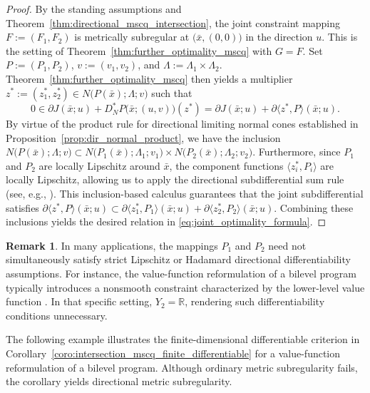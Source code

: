 \documentclass[12pt,twoside,reqno]{amsart}
\theoremstyle{definition}
\newtheorem{remark}[theorem]{Remark}
\numberwithin{equation}{section}
\begin{document}
\begin{proof}
    By the standing assumptions and Theorem~\ref{thm:directional_mscq_intersection}, the joint constraint mapping $F := (F_1, F_2)$ is metrically subregular at $\bigl(\bar{x},(0,0)\bigr)$ in the direction $u$. This is the setting of Theorem~\ref{thm:further_optimality_mscq} with $G=F$. Set $P := (P_1, P_2)$, $v := (v_1, v_2)$, and $\Lambda := \Lambda_1 \times \Lambda_2$. Theorem~\ref{thm:further_optimality_mscq} then yields a multiplier $z^* := (z_1^*, z_2^*) \in N\big(P(\bar{x}); \Lambda; v\big)$ such that
    \begin{equation*}
        0 \in \partial J(\bar{x}; u) + D_N^* P\big(\bar{x}; (u, v)\big)(z^*) = \partial J(\bar{x}; u) + \partial \langle z^*, P \rangle (\bar{x}; u).
    \end{equation*}
    By virtue of the product rule for directional limiting normal cones established in Proposition~\ref{prop:dir_normal_product}, we have the inclusion $N\big(P(\bar{x}); \Lambda; v\big) \subset N\big(P_1(\bar{x}); \Lambda_1; v_1\big) \times N\big(P_2(\bar{x}); \Lambda_2; v_2\big)$. Furthermore, since $P_1$ and $P_2$ are locally Lipschitz around $\bar{x}$, the component functions $\langle z_i^*, P_i \rangle$ are locally Lipschitz, allowing us to apply the directional subdifferential sum rule (see, e.g., \cite[Theorem~2.13]{mao2025directional}). This inclusion-based calculus guarantees that the joint subdifferential satisfies $\partial \langle z^*, P \rangle (\bar{x}; u) \subset \partial \langle z_1^*, P_1 \rangle (\bar{x}; u) + \partial \langle z_2^*, P_2 \rangle (\bar{x}; u)$. Combining these inclusions yields the desired relation in \eqref{eq:joint_optimality_formula}.  
\end{proof}

\begin{remark}
     In many applications, the mappings $P_1$ and $P_2$ need not simultaneously satisfy strict Lipschitz or Hadamard directional differentiability assumptions. For instance, the value-function reformulation of a bilevel program typically introduces a nonsmooth constraint characterized by the lower-level value function \cite{ye1995necessary,Ye1995,ye1997optimal}. In that specific setting, $Y_2 = \mathbb{R}$, rendering such differentiability conditions unnecessary. 
\end{remark}

The following example illustrates the finite-dimensional differentiable
criterion in Corollary~\ref{coro:intersection_mscq_finite_differentiable}
for a value-function reformulation of a bilevel program. Although
ordinary metric subregularity fails, the corollary yields directional
metric subregularity.
\end{document}

